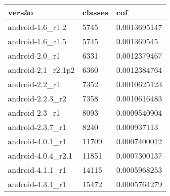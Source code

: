 \begin{tabular}{|l|l|l|}
\hline
versão&classes&cof\\
\hline
android-1.6\_r1.2&5745&0.0013695147\\
\hline
android-1.6\_r1.5&5745&0.001369545\\
\hline
android-2.0\_r1&6331&0.0012379467\\
\hline
android-2.1\_r2.1p2&6360&0.0012384764\\
\hline
android-2.2\_r1&7352&0.0010625123\\
\hline
android-2.2.3\_r2&7358&0.0010616483\\
\hline
android-2.3\_r1&8093&0.0009540904\\
\hline
android-2.3.7\_r1&8240&0.000937113\\
\hline
android-4.0.1\_r1&11709&0.0007400012\\
\hline
android-4.0.4\_r2.1&11851&0.0007300137\\
\hline
android-4.1.1\_r1&14115&0.0005968253\\
\hline
android-4.3.1\_r1&15472&0.0005764279\\
\hline
\end{tabular}
